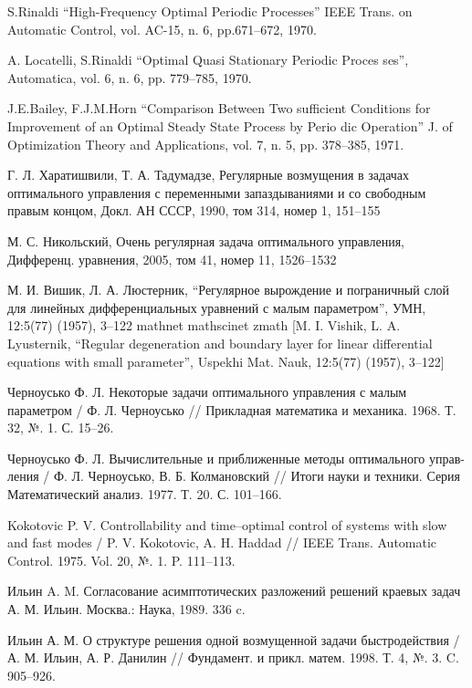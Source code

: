 \documentclass[../main.tex]{subfiles}
\begin{document}
\begin{thebibliography}{99}
S.Rinaldi “High-Frequency Optimal Periodic Processes” IEEE Trans. on Automatic Control, vol. AC-15, n. 6, pp.671–672, 1970.

A. Locatelli, S.Rinaldi “Optimal Quasi Stationary Periodic Proces ses”, Automatica, vol. 6, n. 6, pp. 779–785, 1970.

J.E.Bailey, F.J.M.Horn “Comparison Between Two sufficient Conditions for Improvement of an Optimal Steady State Process by Perio dic Operation” J. of Optimization Theory and Applications, vol. 7, n. 5, pp. 378–385, 1971.

Г. Л. Харатишвили, Т. А. Тадумадзе, Регулярные возмущения в задачах оптимального управления с переменными запаздываниями и со свободным правым концом, Докл. АН СССР, 1990, том 314, номер 1, 151–155

М. С. Никольский, Очень регулярная задача оптимального управления, Дифференц. уравнения, 2005, том 41, номер 11, 1526–1532

М. И. Вишик, Л. А. Люстерник, “Регулярное вырождение и пограничный слой для линейных дифференциальных уравнений с малым параметром”, УМН, 12:5(77) (1957), 3–122  mathnet  mathscinet  zmath [M. I. Vishik, L. A. Lyusternik, “Regular degeneration and boundary layer for linear differential equations with small parameter”, Uspekhi Mat. Nauk, 12:5(77) (1957), 3–122]

Черноусько Ф. Л. Некоторые задачи оптимального управления с малым параметром / Ф. Л. Черноусько // Прикладная математика и механика.  1968.  Т. 32, №. 1.  С. 15–26.

Черноусько Ф. Л. Вычислительные и приближенные методы оптимального управ-ления / Ф. Л. Черноусько, В. Б. Колмановский // Итоги науки и техники. Серия Математический анализ. 1977.  Т. 20.  С. 101–166.

Kokotovic P. V. Controllability and time–optimal control of systems with slow and fast modes / P. V. Kokotovic, A. H. Haddad // IEEE Trans. Automatic Control. 
1975.  Vol. 20, №. 1.  P. 111–113.

Ильин A. M. Согласование асимптотических разложений решений краевых задач А. М. Ильин.  Москва.: Наука, 1989.  336 c.

Ильин А. М. О структуре решения одной возмущенной задачи быстродействия /А. М. Ильин, А. Р. Данилин // Фундамент. и прикл. матем. 1998. Т. 4, №. 3. C. 905–926.


\end{thebibliography}
\end{document}
